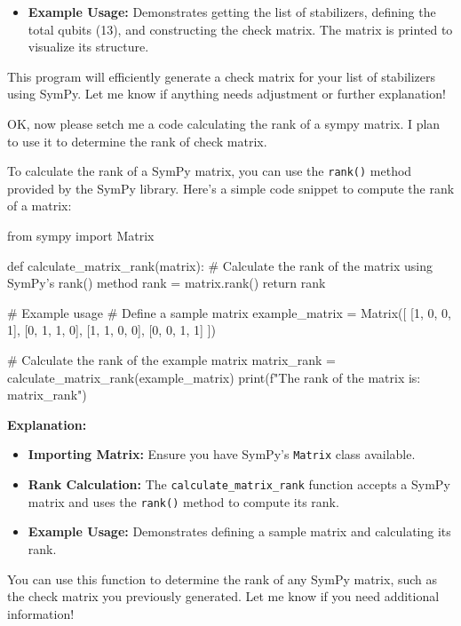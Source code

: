 \begin{airesult}
\begin{itemize}
  \item \textbf{Example Usage:} Demonstrates getting the list of stabilizers, defining the total
        qubits (13), and constructing the check matrix. The matrix is printed to visualize its
        structure.
\end{itemize}

This program will efficiently generate a check matrix for your list of stabilizers using SymPy. Let
me know if anything needs adjustment or further explanation!
\end{airesult}

\begin{ai}
OK, now please setch me a code calculating the rank of a sympy matrix. I plan to use it to determine
the rank of check matrix.
\end{ai}

\begin{airesult}
To calculate the rank of a SymPy matrix, you can use the \verb|rank()| method provided by the SymPy
library. Here's a simple code snippet to compute the rank of a matrix:

\begin{python}
from sympy import Matrix

def calculate_matrix_rank(matrix):
  # Calculate the rank of the matrix using SymPy's rank() method
  rank = matrix.rank()
  return rank

# Example usage
# Define a sample matrix
example_matrix = Matrix([
  [1, 0, 0, 1],
  [0, 1, 1, 0],
  [1, 1, 0, 0],
  [0, 0, 1, 1]
])

# Calculate the rank of the example matrix
matrix_rank = calculate_matrix_rank(example_matrix)
print(f"The rank of the matrix is: {matrix_rank}")
\end{python}

\vsp

\textbf{Explanation:}

\begin{itemize}
  \item \textbf{Importing Matrix:} Ensure you have SymPy's \verb|Matrix| class available.
  \item \textbf{Rank Calculation:} The \verb|calculate_matrix_rank| function accepts a SymPy matrix
and uses the \verb|rank()| method to compute its rank.
  \item \textbf{Example Usage:} Demonstrates defining a sample matrix and calculating its rank.
\end{itemize}

You can use this function to determine the rank of any SymPy matrix, such as the check matrix you
previously generated. Let me know if you need additional information!
\end{airesult}

